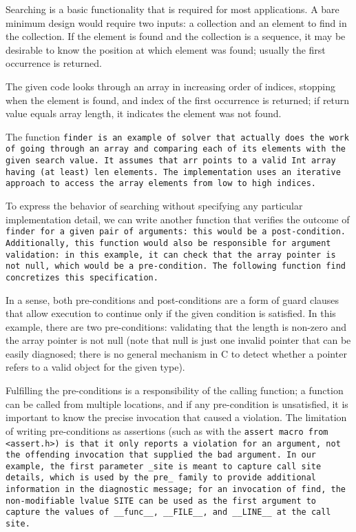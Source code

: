 Searching is a basic functionality that is required for most applications.
A bare minimum design would require two inputs:
a collection and an element to find in the collection.
If the element is found and the collection is a sequence,
it may be desirable to know the position at which element
was found; usually the first occurrence is returned.


The given code looks through an array in increasing order of indices, stopping
when the element is found, and index of the first occurrence is returned;
if return value equals array length, it indicates the element was not found.

The function \tt{finder} is an example of solver that
actually does the work of going through an array and
comparing each of its elements with the given search value.
It assumes that \tt{arr} points to a valid
\tt{Int} array having (at least) \tt{len} elements.
The implementation uses an iterative approach to
access the array elements from low to high indices.

To express the behavior of searching without specifying any particular
implementation detail, we can write another function that verifies the outcome
of \tt{finder} for a given pair of arguments: this would be a post-condition.
Additionally, this function would also be responsible for
argument validation: in this example, it can check that the
array pointer is not null, which would be a pre-condition.
The following function \tt{find} concretizes this specification.


In a sense, both pre-conditions and post-conditions are a form of guard clauses
that allow execution to continue only if the given condition is satisfied.
In this example, there are two pre-conditions: validating that the length is
non-zero and the array pointer is not null (note that null is just one invalid
pointer that can be easily diagnosed; there is no general mechanism in C
to detect whether a pointer refers to a valid object for the given type).

Fulfilling the pre-conditions is a responsibility of the calling function; a
function can be called from multiple locations, and if any pre-condition is
unsatisfied, it is important to know the precise invocation that caused a violation.
The limitation of writing pre-conditions as assertions (such as with the
\tt{assert} macro from \tt{<assert.h>}) is that it only reports a violation
for an argument, not the offending invocation that supplied the bad argument.
In our example, the first parameter \tt{_site} is meant to capture call site
details, which is used by the \tt{pre_} family to provide additional information
in the diagnostic message; for an invocation of \tt{find}, the non-modifiable
lvalue \tt{SITE} can be used as the first argument to capture the values
of \tt{__func__}, \tt{__FILE__}, and \tt{__LINE__} at the call site.


